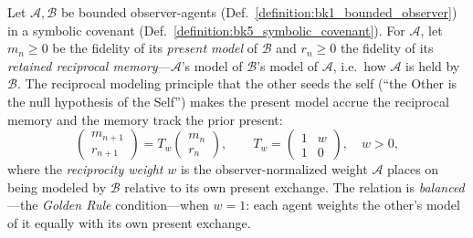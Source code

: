 \begin{definition}
\label{definition:bk5_two_way_street_tensor}
Let $\mathcal{A},\mathcal{B}$ be bounded observer-agents
(Def.~\ref{definition:bk1_bounded_observer}) in a symbolic covenant
(Def.~\ref{definition:bk5_symbolic_covenant}). For $\mathcal{A}$, let
$m_n\ge 0$ be the fidelity of its \emph{present model} of $\mathcal{B}$ and $r_n\ge 0$
the fidelity of its \emph{retained reciprocal memory}---$\mathcal{A}$'s model of
$\mathcal{B}$'s model of $\mathcal{A}$, i.e.\ how $\mathcal{A}$ is held by
$\mathcal{B}$. The reciprocal modeling principle that the other seeds the self
(``the Other is the null hypothesis of the Self'') makes the present model accrue
the reciprocal memory and the memory track the prior present:
\[
\begin{pmatrix}m_{n+1}\\ r_{n+1}\end{pmatrix}
=T_w\begin{pmatrix}m_{n}\\ r_{n}\end{pmatrix},
\qquad
T_w=\begin{pmatrix}1&w\\ 1&0\end{pmatrix},\quad w>0,
\]
where the \emph{reciprocity weight} $w$ is the observer-normalized weight
$\mathcal{A}$ places on being modeled by $\mathcal{B}$ relative to its own present
exchange. The relation is \emph{balanced}---the \emph{Golden Rule} condition---when
$w=1$: each agent weights the other's model of it equally with its own present
exchange.
\end{definition}

